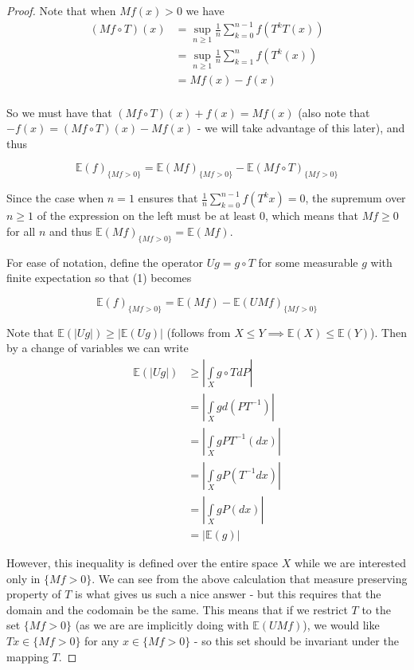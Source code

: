 \documentclass[letterpaper,10pt,oneside,onecolumn,reqno]{amsart}
\newcommand{\E}{\mathbb E}
\newcommand{\sup}{\operatorname{sup}}
\theoremstyle{definition}
\begin{document}
\begin{proof}
Note that when $Mf(x) > 0$ we have
\begin{align*}
(Mf \circ T)(x) &= \sup_{n \geq 1} \frac{1}{n}\sum\limits_{k=0}^{n-1} f(T^k T(x)) \\
&= \sup_{n \geq 1} \frac{1}{n}\sum\limits_{k=1}^{n} f(T^k(x)) \\
&= Mf(x) - f(x) \\
\end{align*}

So we must have that $(Mf \circ T)(x) + f(x) = Mf(x)$ (also note that
 $-f(x) = (Mf \circ T)(x) - Mf(x)$ - we will take advantage of this later), and thus 

\begin{equation}
\E(f)_{\{Mf>0\}} = \E(Mf)_{\{Mf>0\}} - \E(Mf \circ T)_{\{Mf>0\}} 
\end{equation}


Since the case when $n=1$ ensures that $\frac{1}{n}\sum\limits_{k=0}^{n-1}f(T^k x) = 0$, the supremum  over $n \geq 1$ of the expression on the left  must be at least $0$, which means that $Mf \geq 0$ for all $n$ and thus $\E(Mf)_{\{Mf>0\}} = \E(Mf)$. 

For ease of notation, define the operator $Ug = g \circ T$ for some measurable $g$ with finite expectation so that (1) becomes

\begin{equation}
\E(f)_{\{Mf>0\}} = \E(Mf) - \E(UMf)_{\{Mf>0\}} 
\end{equation}

Note that $\E(|Ug|) \geq |\E(Ug)|$ (follows from $X \leq Y \implies \E(X) \leq \E(Y)$). Then by a change of variables we can write
\begin{align*}
\E(|Ug|) &\geq |\int\limits_{X} g \circ T dP| \\
&= |\int\limits_{X} g d(PT^{-1})| \\
&= |\int\limits_{X} g PT^{-1}(dx)| \\
&= |\int\limits_{X} g P(T^{-1}dx)| \\
&= |\int\limits_{X} g P(dx)| \\
&= |\E(g)|
\end{align*}

However, this inequality is defined over the entire space $X$ while we are interested only in $\{Mf > 0\}$. We can see from the above calculation that measure preserving property of $T$ is what gives us such a nice answer - but this requires that the domain and the codomain be the same. This means that if we restrict $T$ to the set $\{Mf > 0\}$ (as we are are implicitly doing with $\E(UMf)$), we would like $Tx \in \{Mf > 0\}$ for any $x \in \{Mf > 0\}$ - so this set should be invariant under the mapping $T$. 


\end{proof}
\end{document}

